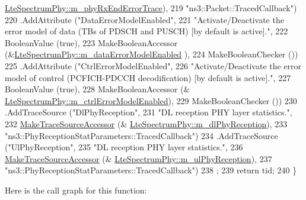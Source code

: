 \begin{DoxyCode}
      \hyperlink{classns3_1_1LteSpectrumPhy_ad75cd3656be0d799015b3ab4667f60e2}{LteSpectrumPhy::m\_phyRxEndErrorTrace}),
219                      \textcolor{stringliteral}{"ns3::Packet::TracedCallback"})
220     .AddAttribute (\textcolor{stringliteral}{"DataErrorModelEnabled"},
221                     \textcolor{stringliteral}{"Activate/Deactivate the error model of data (TBs of PDSCH and PUSCH) [by default is
       active]."},
222                     BooleanValue (\textcolor{keyword}{true}),
223                    MakeBooleanAccessor (&\hyperlink{classns3_1_1LteSpectrumPhy_a0e5c57eaf647ff5723780ac9a4a2da18}{LteSpectrumPhy::m\_dataErrorModelEnabled}
      ),
224                     MakeBooleanChecker ())
225     .AddAttribute (\textcolor{stringliteral}{"CtrlErrorModelEnabled"},
226                     \textcolor{stringliteral}{"Activate/Deactivate the error model of control (PCFICH-PDCCH decodification) [by
       default is active]."},
227                     BooleanValue (\textcolor{keyword}{true}),
228                     MakeBooleanAccessor (&
      \hyperlink{classns3_1_1LteSpectrumPhy_ae3d443a6bcc0f458869155412b9a862f}{LteSpectrumPhy::m\_ctrlErrorModelEnabled}),
229                     MakeBooleanChecker ())
230     .AddTraceSource (\textcolor{stringliteral}{"DlPhyReception"},
231                      \textcolor{stringliteral}{"DL reception PHY layer statistics."},
232                      \hyperlink{group__tracing_gab21a770b9855af4e8f69f7531ea4a6b0}{MakeTraceSourceAccessor} (&
      \hyperlink{classns3_1_1LteSpectrumPhy_a49baf6d8358ac852b51545f752f82d67}{LteSpectrumPhy::m\_dlPhyReception}),
233                      \textcolor{stringliteral}{"ns3::PhyReceptionStatParameters::TracedCallback"})
234     .AddTraceSource (\textcolor{stringliteral}{"UlPhyReception"},
235                      \textcolor{stringliteral}{"DL reception PHY layer statistics."},
236                      \hyperlink{group__tracing_gab21a770b9855af4e8f69f7531ea4a6b0}{MakeTraceSourceAccessor} (&
      \hyperlink{classns3_1_1LteSpectrumPhy_ac86744120540d5bd999d11f3ac452de4}{LteSpectrumPhy::m\_ulPhyReception}),
237                      \textcolor{stringliteral}{"ns3::PhyReceptionStatParameters::TracedCallback"})
238   ;
239   \textcolor{keywordflow}{return} tid;
240 \}
\end{DoxyCode}


Here is the call graph for this function\+:


